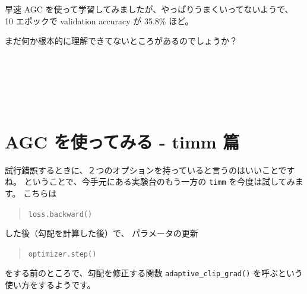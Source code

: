 \documentclass[dvipdfmx,autodetect-engine,10pt,b5paper,papersize,openany,dvipsnames]{jsbook}
\begin{document}
\begin{multicols}{2}
\vspace{5.0cm}

早速 AGC を使って学習してみましたが、やっぱりうまくいってないようで、
10 エポックで validation accuracy が 35.8\% ほど。


\vspace{5.0cm}

まだ何か根本的に理解できてないところがあるのでしょうか？





\section{AGC を使ってみる - timm 篇}
試行錯誤するときに、２つのオプションを持っていると言うのはいいことですね。
ということで、今手元にある実験台のもう一方の \texttt{timm} を今度は試してみます。
こちらは
\begin{quote}
  \texttt{loss.backward()}
\end{quote}
した後（勾配を計算した後）で、
パラメータの更新
\begin{quote}
  \texttt{optimizer.step()}
\end{quote}
をする前のところで、勾配を修正する関数
\texttt{adaptive\_clip\_grad()} を呼ぶという使い方をするようです。



\end{multicols}
\end{document}
